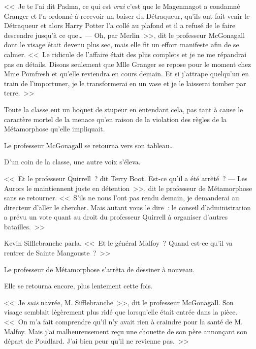 <<~Je te l'ai dit Padma, ce qui est \emph{vrai} c'est que le Magenmagot a condamné Granger et l'a ordonné à recevoir un baiser du Détraqueur, qu'ils ont fait venir le Détraqueur et alors Harry Potter l'a collé au plafond et il a refusé de le faire descendre jusqu'à ce que…
---  Oh, par Merlin~>>, dit le professeur McGonagall dont le visage était devenu plus sec, mais elle fit un effort manifeste afin de se calmer. <<~Le ridicule de l'affaire était des plus complets et je ne me répandrai pas en détails. Disons seulement que Mlle Granger se repose pour le moment chez Mme Pomfresh et qu'elle reviendra en cours demain. Et si j'attrape quelqu'un en train de l'importuner, je le transformerai en un vase et je le laisserai tomber par terre.~>>

Toute la classe eut un hoquet de stupeur en entendant cela, pas tant à cause le caractère mortel de la menace qu'en raison de la violation des règles de la Métamorphose qu'elle impliquait.

Le professeur McGonagall se retourna vers son tableau…

D'un coin de la classe, une autre voix s'éleva.

<<~Et le professeur Quirrell~? dit Terry Boot. Est-ce qu'il a été arrêté~?
---  Les Aurors le maintiennent juste en détention~>>, dit le professeur de Métamorphose sans se retourner. <<~S'ils ne nous l'ont pas rendu demain, je demanderai au directeur d'aller le chercher. Mais autant vous le dire~: le conseil d'administration a prévu un vote quant au droit du professeur Quirrell à organiser d'autres batailles.~>>

Kevin Sifflebranche parla. <<~Et le général Malfoy~? Quand est-ce qu'il va rentrer de Sainte Mangouste~?~>>

Le professeur de Métamorphose s'arrêta de dessiner à nouveau.

Elle se retourna encore, plus lentement cette fois.

<<~Je \emph{suis} navrée, M. Sifflebranche~>>, dit le professeur McGonagall. Son visage semblait légèrement plus ridé que lorsqu'elle était entrée dans la pièce. <<~On m'a fait comprendre qu'il n'y avait rien à craindre pour la santé de M. Malfoy. Mais j'ai malheureusement reçu une chouette de son père annonçant son départ de Poudlard. J'ai bien peur qu'il ne revienne pas.~>>
